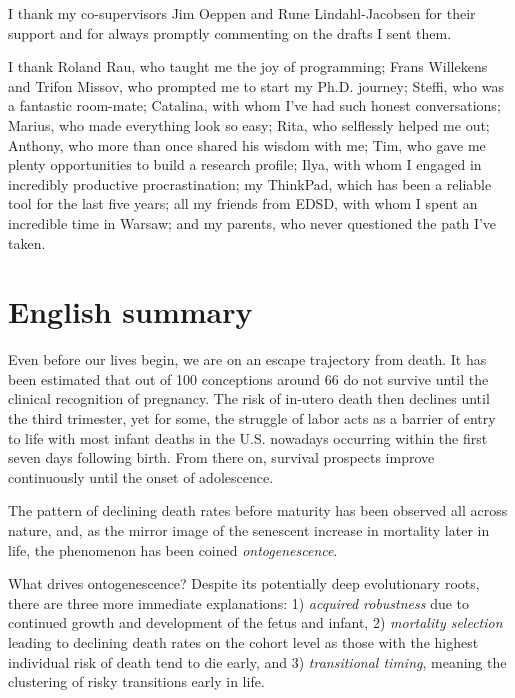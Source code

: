 \documentclass[
  10pt, twoside
]{book}
\begin{document}
I thank my co-supervisors Jim Oeppen and Rune Lindahl-Jacobsen for their support and for always promptly commenting on the drafts I sent them.

I thank Roland Rau, who taught me the joy of programming; Frans Willekens and Trifon Missov, who prompted me to start my Ph.D. journey; Steffi, who was a fantastic room-mate; Catalina, with whom I've had such honest conversations; Marius, who made everything look so easy; Rita, who selflessly helped me out; Anthony, who more than once shared his wisdom with me; Tim, who gave me plenty opportunities to build a research profile; Ilya, with whom I engaged in incredibly productive procrastination; my ThinkPad, which has been a reliable tool for the last five years; all my friends from EDSD, with whom I spent an incredible time in Warsaw; and my parents, who never questioned the path I've taken.

\clearpage


\section*{English summary}

Even before our lives begin, we are on an escape trajectory from death. It has been estimated that out of 100 conceptions around 66 do not survive until the clinical recognition of pregnancy. The risk of in-utero death then declines until the third trimester, yet for some, the struggle of labor acts as a barrier of entry to life with most infant deaths in the U.S. nowadays occurring within the first seven days following birth. From there on, survival prospects improve continuously until the onset of adolescence.

The pattern of declining death rates before maturity has been observed all across nature, and, as the mirror image of the senescent increase in mortality later in life, the phenomenon has been coined \emph{ontogenescence}.

What drives ontogenescence? Despite its potentially deep evolutionary roots, there are three more immediate explanations: 1) \emph{acquired robustness} due to continued growth and development of the fetus and infant, 2) \emph{mortality selection} leading to declining death rates on the cohort level as those with the highest individual risk of death tend to die early, and 3) \emph{transitional timing}, meaning the clustering of risky transitions early in life.
\end{document}
